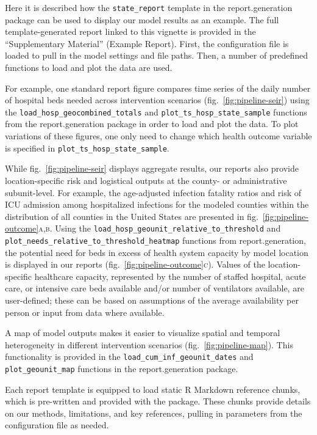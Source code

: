 Here it is described how the \verb|state_report| template in the report.generation package can be used to display our model results as an example. The full template-generated report linked to this vignette is provided in the “Supplementary Material” (Example Report). First, the configuration file is loaded to pull in the model settings and file paths. Then, a number of predefined functions to load and plot the data are used.

For example, one standard report figure compares time series of the daily number of hospital beds needed across intervention scenarios (fig.~\ref{fig:pipeline-seir}) using the \verb|load_hosp_geocombined_totals| and \verb|plot_ts_hosp_state_sample| functions from the report.generation package in order to load and plot the data. To plot variations of these figures, one only need to change which health outcome variable is specified in \verb|plot_ts_hosp_state_sample|.

While fig.~\ref{fig:pipeline-seir} displays aggregate results, our reports also provide location-specific risk and logistical outputs at the county- or administrative subunit-level. For example, the age-adjusted infection fatality ratios and risk of ICU admission among hospitalized infections for the modeled counties within the distribution of all counties in the United States are presented in fig.~\ref{fig:pipeline-outcome}\textsc{a,b}. Using the \verb|load_hosp_geounit_relative_to_threshold| and \verb|plot_needs_relative_to_threshold_heatmap| functions from report.generation, the potential need for beds in excess of health system capacity by model location is displayed in our reports (fig.~\ref{fig:pipeline-outcome}\textsc{c}). Values of the location-specific healthcare capacity, represented by the number of staffed hospital, acute care, or intensive care beds available and/or number of ventilators available, are user-defined; these can be based on assumptions of the average availability per person or input from data where available.

A map of model outputs makes it easier to visualize spatial and temporal heterogeneity in different intervention scenarios (fig.~\ref{fig:pipeline-map}). This functionality is provided in the \verb|load_cum_inf_geounit_dates| and \verb|plot_geounit_map| functions in the report.generation package.

Each report template is equipped to load static R Markdown reference chunks, which is pre-written and provided with the package. These chunks provide details on our methods, limitations, and key references, pulling in parameters from the configuration file as needed.


